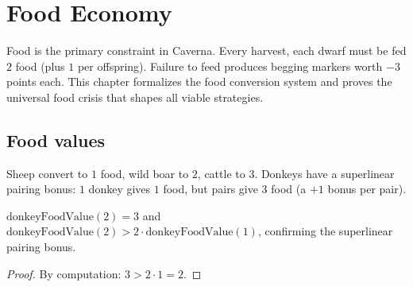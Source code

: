 \chapter{Food Economy}

Food is the primary constraint in Caverna.  Every harvest, each dwarf
must be fed $2$ food (plus $1$ per offspring).  Failure to feed produces
begging markers worth $-3$ points each.  This chapter formalizes the
food conversion system and proves the universal food crisis that shapes
all viable strategies.

\section{Food values}

\begin{definition}
  \label{def:animal_food}
  \leanok
  Sheep convert to $1$ food, wild boar to $2$, cattle to $3$.
  Donkeys have a superlinear pairing bonus: $1$ donkey gives $1$ food,
  but pairs give $3$ food (a $+1$ bonus per pair).
\end{definition}

\begin{theorem}
  \label{thm:donkey_pair}
  \leanok
  $\text{donkeyFoodValue}(2) = 3$ and $\text{donkeyFoodValue}(2) > 2 \cdot \text{donkeyFoodValue}(1)$, confirming the superlinear pairing bonus.
\end{theorem}

\begin{proof}\leanok By computation: $3 > 2 \cdot 1 = 2$.\end{proof}

